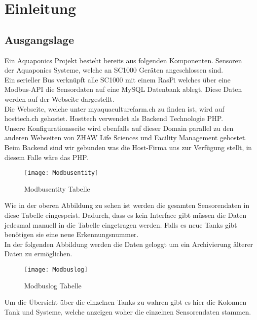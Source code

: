 \documentclass[../main.tex]{subfiles}
\begin{document}
	\section{Einleitung}
	
	\subsection{Ausgangslage}
	Ein Aquaponics Projekt besteht bereits aus folgenden Komponenten. Sensoren der Aquaponics Systeme, welche an SC1000 Geräten angeschlossen sind. \\
	Ein serieller Bus verknüpft alle SC1000 mit einem RasPi welches über eine Modbus-API die Sensordaten auf eine MySQL Datenbank ablegt. Diese Daten werden auf der Webseite dargestellt. \\
	Die Webseite, welche unter myaquaculturefarm.ch zu finden ist, wird auf hosttech.ch gehostet. Hosttech verwendet als Backend Technologie PHP.\\
	Unsere Konfigurationsseite wird ebenfalls auf dieser Domain parallel zu den anderen Webseiten von ZHAW Life Sciences und Facility Management gehostet. \\
	Beim Backend sind wir gebunden was die Host-Firma uns zur Verfügung stellt, in diesem Falle wäre das PHP.
	
	\begin{figure}[H]
		\centering
		\texttt{[image: Modbusentity]}
		\caption{Modbusentity Tabelle}
		\label{fig:Modbusentity}
	\end{figure}
	\par \noindent
	Wie in der oberen Abbildung zu sehen ist werden die gesamten Sensorendaten in diese Tabelle eingespeist. Dadurch, dass es kein Interface gibt müssen die Daten jedesmal manuell in die Tabelle eingetragen werden. Falls es neue Tanks gibt benötigen sie eine neue Erkennungsnummer.  \\
	In der folgenden Abbildung werden die Daten geloggt um ein Archivierung älterer Daten zu ermöglichen.
	
	\begin{figure}[H]
		\centering
		\texttt{[image: Modbuslog]}
		\caption{Modbuslog Tabelle}
		\label{fig:Modbuslog}
	\end{figure}
	\par \noindent	
	Um die Übersicht über die einzelnen Tanks zu wahren gibt es hier die Kolonnen Tank und Systeme, welche anzeigen woher die einzelnen Sensorendaten stammen.
	
\end{document}
